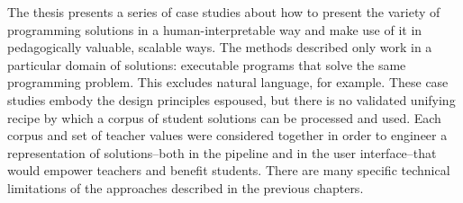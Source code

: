 The thesis presents a series of case studies about how to present the variety of programming solutions in a human-interpretable way and make use of it in pedagogically valuable, scalable ways. The methods described only work in a particular domain of solutions: executable programs that solve the same programming problem. This excludes natural language, for example. These case studies embody the design principles espoused, but there is no validated unifying recipe by which a corpus of student solutions can be processed and used. Each corpus and set of teacher values were considered together in order to engineer a representation of solutions--both in the pipeline and in the user interface--that would empower teachers and benefit students. There are many specific technical limitations of the approaches described in the previous chapters. %


\begin{comment}
\section{Design Recommendations}

While this thesis does not offer a unifying recipe, these are some design recommendations based on experience accumulated since the start of this thesis:
\begin{enumerate}
\item When possible to do with high confidence, propagate human-assigned labels to similar data points.%
\item Avoid outliers within clusters at all costs, because they cause doubt and confusion. 
\end{enumerate}
\end{comment}
